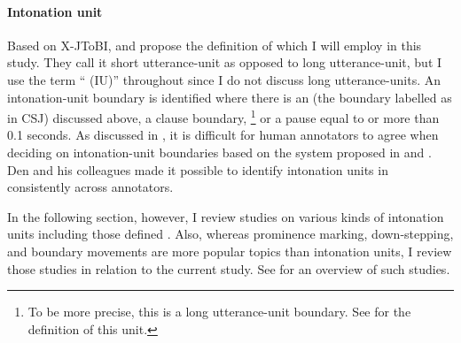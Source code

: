 \paragraph{Intonation unit}

Based on X-JToBI,
 and  propose the definition of 
which I will employ in this study.
They call it short utterance-unit as opposed to long utterance-unit,
but I use the term `` (IU)'' throughout
since I do not discuss long utterance-units.
An intonation-unit boundary is identified
where there is an  (the boundary labelled as  in CSJ) discussed above,
a clause boundary,%
	\footnote{
	To be more precise, this is a long utterance-unit boundary.
	See  for the definition of this unit.
	}
or
a pause equal to or more than 0.1 seconds.
As discussed in ,
it is difficult for human annotators to agree when deciding on intonation-unit boundaries based on the system proposed in  and .
Den and his colleagues made it possible to identify intonation units in  consistently across annotators.

In the following section, however,
I review studies on various kinds of intonation units including those defined .
Also, whereas prominence marking, down-step\-ping, and boundary  movements are more popular topics than intonation units,
I review those studies in relation to the current study.
See  for an overview of such studies.


%
%
%
%





